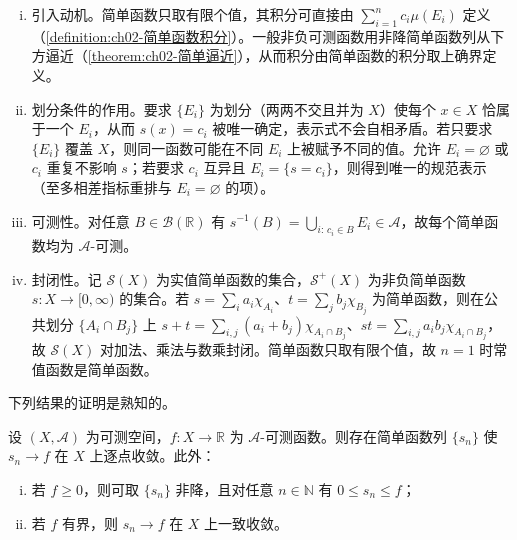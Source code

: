 \documentclass[../../main.tex]{subfiles}%
\begin{document}
\begin{remark}\label{remark:ch02-简单函数}
\begin{enumerate}[(i)]
\item 引入动机。简单函数只取有限个值，其积分可直接由 $\sum_{i=1}^n c_i\mu(E_i)$ 定义（\cref{definition:ch02-简单函数积分}）。一般非负可测函数用非降简单函数列从下方逼近（\cref{theorem:ch02-简单逼近}），从而积分由简单函数的积分取上确界定义。
\item 划分条件的作用。要求 $\{E_i\}$ 为划分（两两不交且并为 $X$）使每个 $x\in X$ 恰属于一个 $E_i$，从而 $s(x)=c_i$ 被唯一确定，表示式不会自相矛盾。若只要求 $\{E_i\}$ 覆盖 $X$，则同一函数可能在不同 $E_i$ 上被赋予不同的值。允许 $E_i=\varnothing$ 或 $c_i$ 重复不影响 $s$；若要求 $c_i$ 互异且 $E_i=\{s=c_i\}$，则得到唯一的规范表示（至多相差指标重排与 $E_i=\varnothing$ 的项）。
\item 可测性。对任意 $B\in\mathscr B(\mathbb{R})$ 有 $s^{-1}(B)=\bigcup_{i:\,c_i\in B}E_i\in\mathscr A$，故每个简单函数均为 $\mathscr A$-可测。
\item 封闭性。记 $\mathscr S(X)$ 为实值简单函数的集合，$\mathscr S^+(X)$ 为非负简单函数 $s:X\to[0,\infty)$ 的集合。若 $s=\sum_i a_i\chi_{A_i}$、$t=\sum_j b_j\chi_{B_j}$ 为简单函数，则在公共划分 $\{A_i\cap B_j\}$ 上 $s+t=\sum_{i,j}(a_i+b_j)\chi_{A_i\cap B_j}$、$st=\sum_{i,j}a_ib_j\chi_{A_i\cap B_j}$，故 $\mathscr S(X)$ 对加法、乘法与数乘封闭。简单函数只取有限个值，故 $n=1$ 时常值函数是简单函数。
\end{enumerate}
\end{remark}

下列结果的证明是熟知的。

\begin{theorem}\label{theorem:ch02-简单逼近}\label{theorem:ch02-简单函数逼近}
设 $(X,\mathscr A)$ 为可测空间，$f:X\to\mathbb{R}$ 为 $\mathscr A$-可测函数。则存在简单函数列 $\{s_n\}$ 使 $s_n\to f$ 在 $X$ 上逐点收敛。此外：
\begin{enumerate}[(i)]
\item 若 $f\geqslant0$，则可取 $\{s_n\}$ 非降，且对任意 $n\in\mathbb{N}$ 有 $0\leqslant s_n\leqslant f$；
\item 若 $f$ 有界，则 $s_n\to f$ 在 $X$ 上一致收敛。
\end{enumerate}
\end{theorem}
\end{document}

